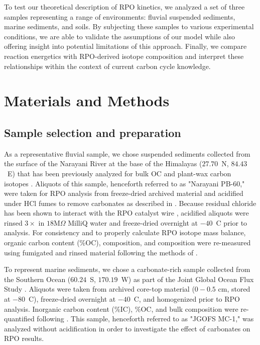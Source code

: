 To test our theoretical description of RPO kinetics, we analyzed a set of three samples representing a range of environments: fluvial suspended sediments, marine sediments, and soils. By subjecting these samples to various experimental conditions, we are able to validate the assumptions of our model while also offering insight into potential limitations of this approach. Finally, we compare reaction energetics with RPO-derived isotope composition and interpret these relationships within the context of current carbon cycle knowledge.

\section{Materials and Methods}

\subsection{Sample selection and preparation}

As a representative fluvial sample, we chose suspended sediments collected from the surface of the Narayani River at the base of the Himalayas ($27.70$\textdegree\ N, $84.43$\textdegree\ E) that has been previously analyzed for bulk OC and plant-wax carbon isotopes \citep{Galy:2008jw,Galy:2011hk,Galy:2011ix}. Aliquots of this sample, henceforth referred to as "Narayani PB-60," were taken for RPO analysis from freeze-dried archived material and acidified under HCl fumes to remove carbonates as described in \citet{Whiteside:2011jea}. Because residual chloride has been shown to interact with the RPO catalyst wire \citep{Hemingway:2016rc}, acidified aliquots were rinsed $3\times$ in $18$M$\Omega$ MilliQ water and freeze-dried overnight at $-40$\textdegree\ C prior to analysis. For consistency and to properly calculate RPO isotope mass balance, organic carbon content (\%OC),  composition, and  composition were re-measured using fumigated and rinsed material following the methods of \citet{McNichol:1994dt,McNichol:1994ty}.

To represent marine sediments, we chose a carbonate-rich sample collected from the Southern Ocean ($60.24$\textdegree\ S, $170.19$\textdegree\ W) as part of the Joint Global Ocean Flux Study \citep[JGOFS;][]{Sayles:2001ua}. Aliquots were taken from archived core-top material ($0 - 0.5$ cm, stored at $-80$\textdegree\ C), freeze-dried overnight at $-40$\textdegree\ C, and homogenized prior to RPO analysis. Inorganic carbon content (\%IC), \%OC, and bulk  composition were re-quantified following \citet{McNichol:1994dt}. This sample, henceforth referred to as "JGOFS MC-1," was analyzed without acidification in order to investigate the effect of carbonates on RPO results.

